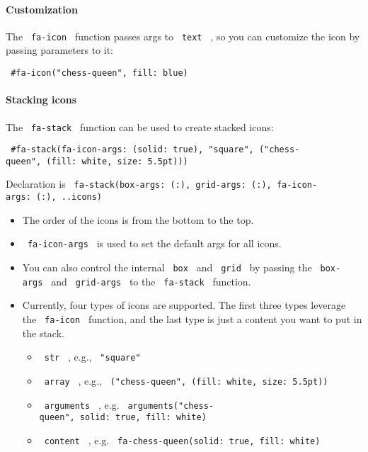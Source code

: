 \paragraph{Customization}\label{customization}

The \texttt{\ fa-icon\ } function passes args to \texttt{\ text\ } , so
you can customize the icon by passing parameters to it:

\texttt{\ \#fa-icon("chess-queen",\ fill:\ blue)\ }

\paragraph{Stacking icons}\label{stacking-icons}

The \texttt{\ fa-stack\ } function can be used to create stacked icons:

\texttt{\ \#fa-stack(fa-icon-args:\ (solid:\ true),\ "square",\ ("chess-queen",\ (fill:\ white,\ size:\ 5.5pt)))\ }

Declaration is
\texttt{\ fa-stack(box-args:\ (:),\ grid-args:\ (:),\ fa-icon-args:\ (:),\ ..icons)\ }

\begin{itemize}
\tightlist
\item
  The order of the icons is from the bottom to the top.
\item
  \texttt{\ fa-icon-args\ } is used to set the default args for all
  icons.
\item
  You can also control the internal \texttt{\ box\ } and
  \texttt{\ grid\ } by passing the \texttt{\ box-args\ } and
  \texttt{\ grid-args\ } to the \texttt{\ fa-stack\ } function.
\item
  Currently, four types of icons are supported. The first three types
  leverage the \texttt{\ fa-icon\ } function, and the last type is just
  a content you want to put in the stack.

  \begin{itemize}
  \tightlist
  \item
    \texttt{\ str\ } , e.g., \texttt{\ "square"\ }
  \item
    \texttt{\ array\ } , e.g.,
    \texttt{\ ("chess-queen",\ (fill:\ white,\ size:\ 5.5pt))\ }
  \item
    \texttt{\ arguments\ } , e.g.
    \texttt{\ arguments("chess-queen",\ solid:\ true,\ fill:\ white)\ }
  \item
    \texttt{\ content\ } , e.g.
    \texttt{\ fa-chess-queen(solid:\ true,\ fill:\ white)\ }
  \end{itemize}
\end{itemize}

